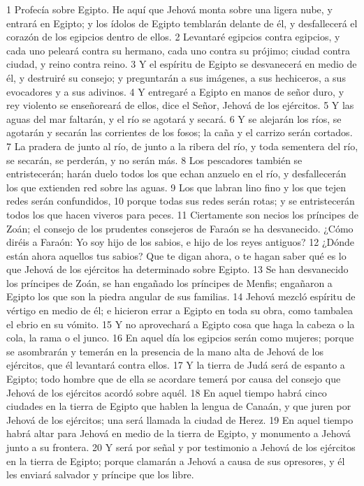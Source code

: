 1 Profecía sobre Egipto. He aquí que Jehová monta sobre una ligera nube, y entrará en Egipto; y los ídolos de Egipto temblarán delante de él, y desfallecerá el corazón de los egipcios dentro de ellos.
2 Levantaré egipcios contra egipcios, y cada uno peleará contra su hermano, cada uno contra su prójimo; ciudad contra ciudad, y reino contra reino.
3 Y el espíritu de Egipto se desvanecerá en medio de él, y destruiré su consejo; y preguntarán a sus imágenes, a sus hechiceros, a sus evocadores y a sus adivinos.
4 Y entregaré a Egipto en manos de señor duro, y rey violento se enseñoreará de ellos, dice el Señor, Jehová de los ejércitos.
5 Y las aguas del mar faltarán, y el río se agotará y secará.
6 Y se alejarán los ríos, se agotarán y secarán las corrientes de los fosos; la caña y el carrizo serán cortados.
7 La pradera de junto al río, de junto a la ribera del río, y toda sementera del río, se secarán, se perderán, y no serán más.
8 Los pescadores también se entristecerán; harán duelo todos los que echan anzuelo en el río, y desfallecerán los que extienden red sobre las aguas.
9 Los que labran lino fino y los que tejen redes serán confundidos,
10 porque todas sus redes serán rotas; y se entristecerán todos los que hacen viveros para peces.
11 Ciertamente son necios los príncipes de Zoán; el consejo de los prudentes consejeros de Faraón se ha desvanecido. ¿Cómo diréis a Faraón: Yo soy hijo de los sabios, e hijo de los reyes antiguos?
12 ¿Dónde están ahora aquellos tus sabios? Que te digan ahora, o te hagan saber qué es lo que Jehová de los ejércitos ha determinado sobre Egipto.
13 Se han desvanecido los príncipes de Zoán, se han engañado los príncipes de Menfis; engañaron a Egipto los que son la piedra angular de sus familias.
14 Jehová mezcló espíritu de vértigo en medio de él; e hicieron errar a Egipto en toda su obra, como tambalea el ebrio en su vómito.
15 Y no aprovechará a Egipto cosa que haga la cabeza o la cola, la rama o el junco.
16 En aquel día los egipcios serán como mujeres; porque se asombrarán y temerán en la presencia de la mano alta de Jehová de los ejércitos, que él levantará contra ellos.
17 Y la tierra de Judá será de espanto a Egipto; todo hombre que de ella se acordare temerá por causa del consejo que Jehová de los ejércitos acordó sobre aquél.
18 En aquel tiempo habrá cinco ciudades en la tierra de Egipto que hablen la lengua de Canaán, y que juren por Jehová de los ejércitos; una será llamada la ciudad de Herez.
19 En aquel tiempo habrá altar para Jehová en medio de la tierra de Egipto, y monumento a Jehová junto a su frontera.
20 Y será por señal y por testimonio a Jehová de los ejércitos en la tierra de Egipto; porque clamarán a Jehová a causa de sus opresores, y él les enviará salvador y príncipe que los libre.
